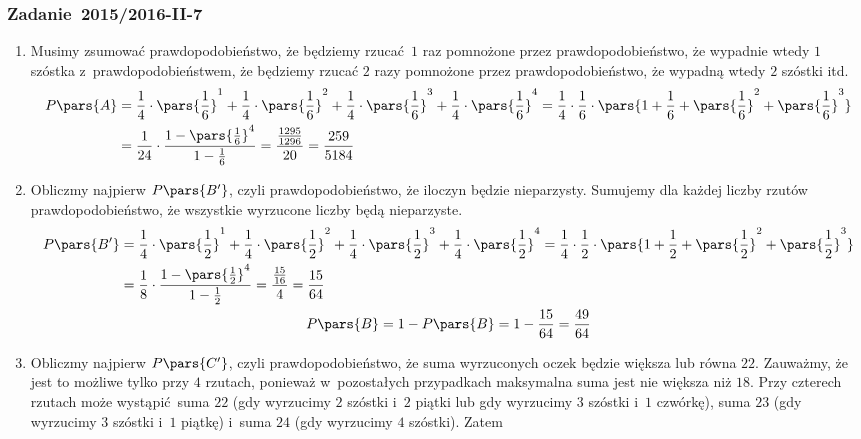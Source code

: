 \subsubsection*{Zadanie~2015/2016-II-7}
\begin{enumerate}[label={\Alph*:}]
    \item Musimy zsumować prawdopodobieństwo, że będziemy rzucać \(1\) raz pomnożone przez prawdopodobieństwo, że wypadnie wtedy \(1\) szóstka z~prawdopodobieństwem, że będziemy rzucać \(2\) razy pomnożone przez prawdopodobieństwo, że wypadną wtedy \(2\) szóstki itd.
        \begin{equation*}
            \begin{split}
                P\pars{A}
                &= \frac{1}{4} \cdot \pars{\frac{1}{6}}^1 + \frac{1}{4} \cdot \pars{\frac{1}{6}}^2 + \frac{1}{4} \cdot \pars{\frac{1}{6}}^3 + \frac{1}{4} \cdot \pars{\frac{1}{6}}^4
                = \frac{1}{4} \cdot \frac{1}{6} \cdot \pars{1 + \frac{1}{6} + \pars{\frac{1}{6}}^2 + \pars{\frac{1}{6}}^3}\\
                &= \frac{1}{24} \cdot \frac{1 - \pars{\frac{1}{6}}^4}{1 - \frac{1}{6}}
                = \frac{\frac{1295}{1296}}{20}
                = \frac{259}{5184}
            \end{split}
        \end{equation*}
    \item Obliczmy najpierw \(P\pars{B'}\), czyli prawdopodobieństwo, że iloczyn będzie nieparzysty. Sumujemy dla każdej liczby rzutów prawdopodobieństwo, że wszystkie wyrzucone liczby będą nieparzyste.
        \begin{gather*}
            \begin{split}
                P\pars{B'}
                &= \frac{1}{4} \cdot \pars{\frac{1}{2}}^1 + \frac{1}{4} \cdot \pars{\frac{1}{2}}^2 + \frac{1}{4} \cdot \pars{\frac{1}{2}}^3 + \frac{1}{4} \cdot \pars{\frac{1}{2}}^4
                = \frac{1}{4} \cdot \frac{1}{2} \cdot \pars{1 + \frac{1}{2} + \pars{\frac{1}{2}}^2 + \pars{\frac{1}{2}}^3}\\
                &= \frac{1}{8} \cdot \frac{1 - \pars{\frac{1}{2}}^4}{1 - \frac{1}{2}}
                = \frac{\frac{15}{16}}{4}
                = \frac{15}{64}
            \end{split}\\
            P\pars{B}
            = 1 - P\pars{B}
            = 1 - \frac{15}{64}
            = \frac{49}{64}
        \end{gather*}
    \item Obliczmy najpierw \(P\pars{C'}\), czyli prawdopodobieństwo, że suma wyrzuconych oczek będzie większa lub równa \(22\). Zauważmy, że jest to możliwe tylko przy \(4\) rzutach, ponieważ w~pozostałych przypadkach maksymalna suma jest nie większa niż \(18\). Przy czterech rzutach może wystąpić suma \(22\) (gdy wyrzucimy \(2\) szóstki i~\(2\) piątki lub gdy wyrzucimy \(3\) szóstki i~\(1\) czwórkę), suma \(23\) (gdy wyrzucimy \(3\) szóstki i~\(1\) piątkę) i~suma \(24\) (gdy wyrzucimy \(4\) szóstki). Zatem

\end{enumerate}
